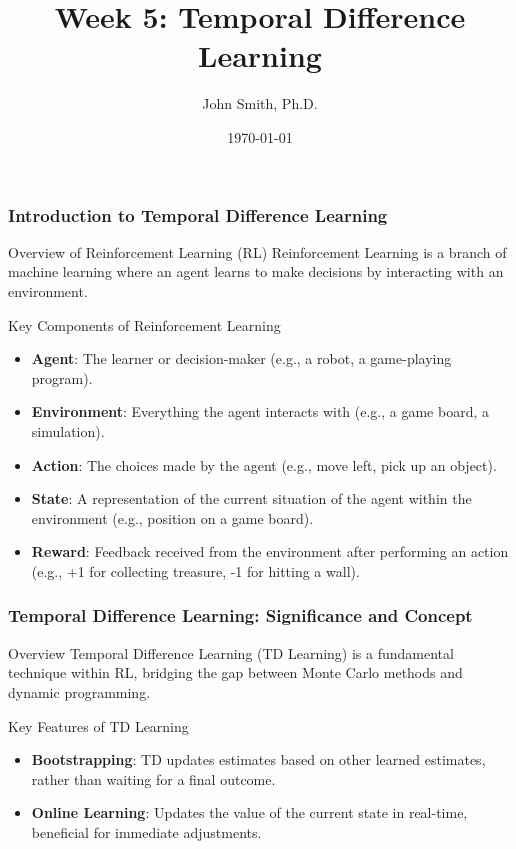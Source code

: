 \documentclass[aspectratio=169]{beamer}
\title[Temporal Difference Learning]{Week 5: Temporal Difference Learning}
\author[J. Smith]{John Smith, Ph.D.}
\institute[University Name]{
  Department of Computer Science\\
  University Name\\
  \vspace{0.3cm}
  Email: email@university.edu\\
  Website: www.university.edu
}
\date{\today}
\begin{document}
\frame{\titlepage}

\begin{frame}[fragile]
    \frametitle{Introduction to Temporal Difference Learning}
    \begin{block}{Overview of Reinforcement Learning (RL)}
        Reinforcement Learning is a branch of machine learning where an agent learns to make decisions by interacting with an environment.
    \end{block}
    \begin{block}{Key Components of Reinforcement Learning}
        \begin{itemize}
            \item \textbf{Agent}: The learner or decision-maker (e.g., a robot, a game-playing program).
            \item \textbf{Environment}: Everything the agent interacts with (e.g., a game board, a simulation).
            \item \textbf{Action}: The choices made by the agent (e.g., move left, pick up an object).
            \item \textbf{State}: A representation of the current situation of the agent within the environment (e.g., position on a game board).
            \item \textbf{Reward}: Feedback received from the environment after performing an action (e.g., +1 for collecting treasure, -1 for hitting a wall).
        \end{itemize}
    \end{block}
\end{frame}

\begin{frame}[fragile]
    \frametitle{Temporal Difference Learning: Significance and Concept}
    \begin{block}{Overview}
        Temporal Difference Learning (TD Learning) is a fundamental technique within RL, bridging the gap between Monte Carlo methods and dynamic programming.
    \end{block}
    \begin{block}{Key Features of TD Learning}
        \begin{itemize}
            \item \textbf{Bootstrapping}: TD updates estimates based on other learned estimates, rather than waiting for a final outcome.
            \item \textbf{Online Learning}: Updates the value of the current state in real-time, beneficial for immediate adjustments.
        \end{itemize}
    \end{block}
\end{frame}
\end{document}
